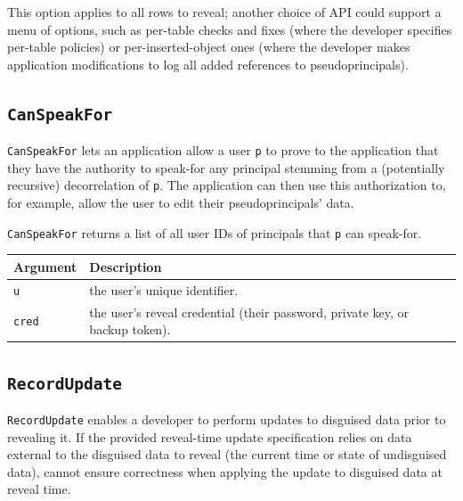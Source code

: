 This option applies to all rows to reveal; another choice of API
could support a menu of options, such as per-table checks and fixes
(where the developer specifies per-table policies) or
per-inserted-object ones (where the developer makes application
modifications to log all added references to pseudoprincipals).

\subsection{\texttt{CanSpeakFor}}
    \texttt{CanSpeakFor} lets an application allow a user \texttt{p} to prove to
    the application that they have the authority to speak-for any principal
    stemming from a (potentially recursive) decorrelation of \texttt{p}. The
    application can then use this authorization to, for example, allow the user
    to edit their pseudoprincipals' data.
    
    \texttt{CanSpeakFor} returns a list of all user IDs of principals that
    \texttt{p} can speak-for.

\begin{center}
    \begin{longtable}{|m{}|m{}|}
        \hline
        \textbf{Argument} & \textbf{Description} \\
        \hline
             \texttt{u}& the user's unique identifier. \\
        \hline
             \texttt{cred}& the user's reveal credential (their password, private key, or
    backup token).\\
        \hline
    \end{longtable}
    \end{center}
   
    
\subsection{\texttt{RecordUpdate}}
\label{s:semantics:updates}

\texttt{RecordUpdate} enables a developer to perform updates to disguised data prior to revealing it.
If the provided reveal-time update specification relies on data external to the
disguised data to reveal (\eg the current time or state of undisguised data),
\sys cannot ensure correctness when applying the update to disguised data at
reveal time.

